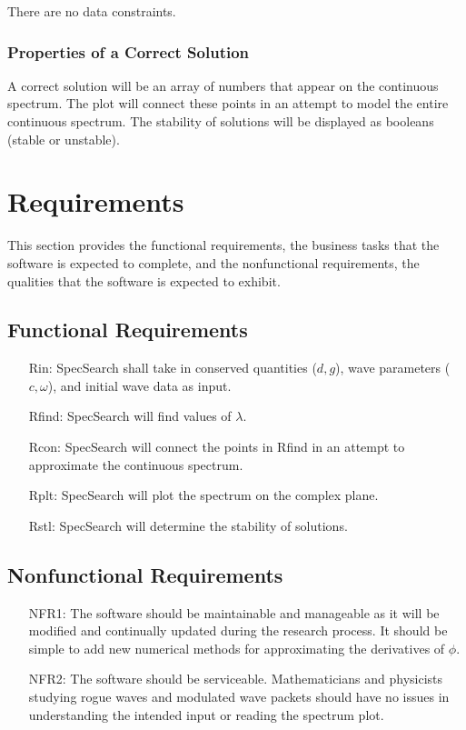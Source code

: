 \documentclass[12pt]{article}
\begin{document}
There are no data constraints. 

\subsubsection{Properties of a Correct Solution} \label{sec_CorrectSolution}

\noindent
A correct solution will be an array of numbers that appear on the continuous 
spectrum. The plot will connect these points in an attempt to model the entire 
continuous spectrum. The stability of solutions will be displayed as booleans 
(stable or unstable). 

\section{Requirements}

This section provides the functional requirements, the business tasks that the
software is expected to complete, and the nonfunctional requirements, the
qualities that the software is expected to exhibit.

\subsection{Functional Requirements}

\noindent \begin{itemize}

\item[Rin:] SpecSearch shall 
take in 
conserved quantities ($d,g$), wave parameters ($c,\omega$), and initial wave 
data 
as input. 

\item[Rfind:] SpecSearch 
will find values of $\lambda$.

\item[Rcon:] SpecSearch will 
connect the points in Rfind in an attempt to approximate the continuous 
spectrum.

\item[Rplt:] SpecSearch 
will plot the spectrum on the complex plane. 

\item[Rstl:] SpecSearch 
will determine the stability of solutions.  


\end{itemize}

\subsection{Nonfunctional Requirements}
\noindent \begin{itemize}
\item[NFR1:] The software should be maintainable and manageable as it will 
be modified and continually updated during the research process. It should be 
simple to add new numerical methods for approximating the derivatives of 
$\phi$.  
\item[NFR2:] The software should be serviceable. Mathematicians and physicists 
studying rogue waves and modulated wave packets should have no issues in 
understanding the intended input or reading the spectrum plot. 
\end{itemize}
\end{document}
